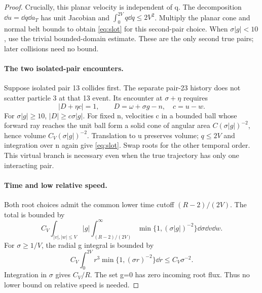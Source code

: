 \documentclass[11pt,letterpaper]{article}
\theoremstyle{remark}\newtheorem{remark}[theorem]{Remark}
\numberwithin{equation}{section}
\begin{document}
\begin{proof}
Crucially, this planar velocity is independent of q. The decomposition $\dd u=\dd q\dd a_T$ has unit Jacobian and $\int_0^{2V}q\dd q\le2V^2$. Multiply the planar cone and normal belt bounds to obtain \eqref{eq:slot} for this second-pair choice. When $\sigma|g|<10$, use the trivial bounded-domain estimate. These are the only second true pairs; later collisions need no bound.

\paragraph{The two isolated-pair encounters.}
Suppose isolated pair 13 collides first. The separate pair-23 history does not scatter particle 3 at that 13 event. Its encounter at $\sigma+\eta$ requires
\[
 |D+\eta c|=1,\qquad D=\omega+\sigma g-n,\quad c=u-w.
\]
For $\sigma|g|\ge10$, $|D|\ge c\sigma|g|$. For fixed n, velocities c in a bounded ball whose forward ray reaches the unit ball form a solid cone of angular area $C(\sigma|g|)^{-2}$, hence volume $C_V(\sigma|g|)^{-2}$. Translation to u preserves volume; $q\le2V$ and integration over n again give \eqref{eq:slot}. Swap roots for the other temporal order. This virtual branch is necessary even when the true trajectory has only one interacting pair.

\paragraph{Time and low relative speed.}
Both root choices admit the common lower time cutoff $(R-2)/(2V)$. The total is bounded by
\[
 C_V\int_{|v|,|w|\le V}|g|\int_{(R-2)/(2V)}^\infty
               \min\{1,(\sigma|g|)^{-2}\}\dd\sigma\dd v\dd w.
\]
For $\sigma\ge1/V$, the radial g integral is bounded by
\[
 C_V\int_0^{2V}r^3\min\{1,(\sigma r)^{-2}\}\dd r\le C_V\sigma^{-2}.
\]
Integration in $\sigma$ gives $C_V/R$. The set g=0 has zero incoming root flux. Thus no lower bound on relative speed is needed.
\end{proof}
\end{document}
